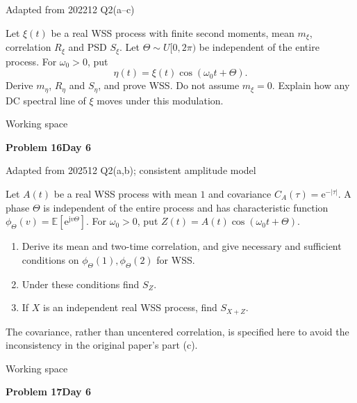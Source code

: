 \documentclass[11pt]{article}
\newcommand{\E}{\mathbb E}\newcommand{\ee}{\mathrm e}\newcommand{\jj}{\mathrm j}
\newcommand{\qtitle}[2]{\clearpage\begin{tcolorbox}[colback=navy,colframe=navy,arc=1.5pt,boxrule=0pt]\color{white}\large\bfseries #1\hfill\small #2\end{tcolorbox}}
\begin{document}
{\small\color{accentred}Adapted from 202212 Q2(a--c)}\par{}\par{}\par\smallskip\begin{tcolorbox}[colback=qbg,colframe=qbg,boxrule=0pt]Let $\xi(t)$ be a real WSS process with finite second moments, mean $m_\xi$, correlation $R_\xi$ and PSD $S_\xi$. Let $\Theta\sim U[0,2\pi)$ be independent of the entire process. For $\omega_0>0$, put
\[\eta(t)=\xi(t)\cos(\omega_0t+\Theta).\]
Derive $m_\eta$, $R_\eta$ and $S_\eta$, and prove WSS. Do not assume $m_\xi=0$. Explain how any DC spectral line of $\xi$ moves under this modulation.\end{tcolorbox}\smallskip\begin{workspace}\hfill{\color{linec}\footnotesize Working space}\end{workspace}
\qtitle{Problem 16}{Day 6}
{\small\color{accentred}Adapted from 202512 Q2(a,b); consistent amplitude model}\par{}\par{}\par\smallskip\begin{tcolorbox}[colback=qbg,colframe=qbg,boxrule=0pt]Let $A(t)$ be a real WSS process with mean $1$ and covariance $C_A(\tau)=\ee^{-|\tau|}$. A phase $\Theta$ is independent of the entire process and has characteristic function $\phi_\Theta(v)=\E[\ee^{\jj v\Theta}]$. For $\omega_0>0$, put $Z(t)=A(t)\cos(\omega_0t+\Theta)$.
\begin{enumerate}\item Derive its mean and two-time correlation, and give necessary and sufficient conditions on $\phi_\Theta(1),\phi_\Theta(2)$ for WSS.\item Under these conditions find $S_Z$.\item If $X$ is an independent real WSS process, find $S_{X+Z}$.\end{enumerate}
The covariance, rather than uncentered correlation, is specified here to avoid the inconsistency in the original paper's part (c).\end{tcolorbox}\smallskip\begin{workspace}\hfill{\color{linec}\footnotesize Working space}\end{workspace}
\qtitle{Problem 17}{Day 6}
\end{document}
